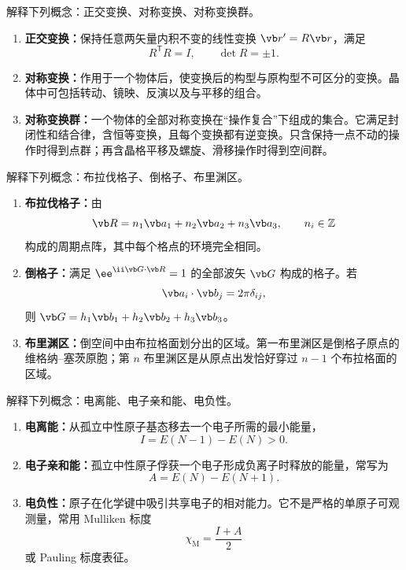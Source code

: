 \begin{question}[5 分]
解释下列概念：正交变换、对称变换、对称变换群。


\begin{solution}
\begin{enumerate}
  \item \textbf{正交变换：}保持任意两矢量内积不变的线性变换 $\vb r'=R\vb r$，满足
  \[
    R^{\mathsf T}R=I,\qquad \det R=\pm1.
  \]
  \item \textbf{对称变换：}作用于一个物体后，使变换后的构型与原构型不可区分的变换。晶体中可包括转动、镜映、反演以及与平移的组合。
  \item \textbf{对称变换群：}一个物体的全部对称变换在“操作复合”下组成的集合。它满足封闭性和结合律，含恒等变换，且每个变换都有逆变换。只含保持一点不动的操作时得到点群；再含晶格平移及螺旋、滑移操作时得到空间群。
\end{enumerate}
\end{solution}
\end{question}

\begin{question}[5 分]
解释下列概念：布拉伐格子、倒格子、布里渊区。


\begin{solution}
\begin{enumerate}
  \item \textbf{布拉伐格子：}由
  \[
    \vb R=n_1\vb a_1+n_2\vb a_2+n_3\vb a_3,
    \qquad n_i\in\mathbb Z
  \]
  构成的周期点阵，其中每个格点的环境完全相同。
  \item \textbf{倒格子：}满足 $\ee^{\ii\vb G\cdot\vb R}=1$ 的全部波矢 $\vb G$ 构成的格子。若
  \[
    \vb a_i\cdot\vb b_j=2\pi\delta_{ij},
  \]
  则 $\vb G=h_1\vb b_1+h_2\vb b_2+h_3\vb b_3$。
  \item \textbf{布里渊区：}倒空间中由布拉格面划分出的区域。第一布里渊区是倒格子原点的维格纳--塞茨原胞；第 $n$ 布里渊区是从原点出发恰好穿过 $n-1$ 个布拉格面的区域。
\end{enumerate}
\end{solution}
\end{question}

\begin{question}[5 分]
解释下列概念：电离能、电子亲和能、电负性。


\begin{solution}
\begin{enumerate}
  \item \textbf{电离能：}从孤立中性原子基态移去一个电子所需的最小能量，
  \[
    I=E(N-1)-E(N)>0.
  \]
  \item \textbf{电子亲和能：}孤立中性原子俘获一个电子形成负离子时释放的能量，常写为
  \[
    A=E(N)-E(N+1).
  \]
  \item \textbf{电负性：}原子在化学键中吸引共享电子的相对能力。它不是严格的单原子可观测量，常用 Mulliken 标度
  \[
    \chi_{\mathrm M}=\frac{I+A}{2}
  \]
  或 Pauling 标度表征。
\end{enumerate}
\end{solution}
\end{question}

